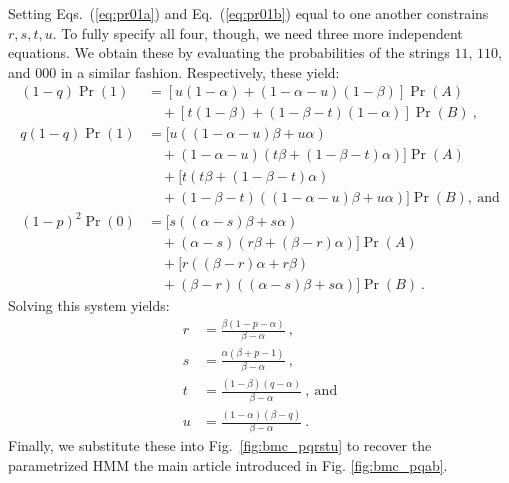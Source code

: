 \documentclass[final,nofootinbib,aps,pre,twocolumn,showpacs,groupaddress,preprintnumbers,floatfix]{revtex4-1}
\begin{document}
Setting Eqs.~(\ref{eq:pr01a}) and Eq.~(\ref{eq:pr01b}) equal to one another
constrains $r,s,t,u$. To fully specify all four, though, we need
three more independent equations. We obtain these by evaluating the
probabilities of the strings $11$, $110$, and $000$ in a similar
fashion. Respectively, these yield:
\begin{align*}
(1-q)\Pr(1) &= [u(1-\alpha)+(1-\alpha-u)(1-\beta)]\Pr(A) \\
            & \quad + [t(1-\beta)+(1-\beta-t)(1-\alpha)]\Pr(B)
  ~, \\
q(1-q)\Pr(1) &= [u((1-\alpha-u)\beta+u\alpha)\nonumber\\
             & \quad +(1-\alpha-u)(t\beta+(1-\beta-t)\alpha)]\Pr(A)\nonumber\\
             & \quad + [t(t\beta+(1-\beta-t)\alpha)\nonumber\\
             & \quad +(1-\beta-t)((1-\alpha-u)\beta+u\alpha)]\Pr(B)
  ,~\text{and} \\
(1-p)^2\Pr(0) &= [s((\alpha-s)\beta+s\alpha)\nonumber\\
              & \quad +(\alpha-s)(r\beta+(\beta-r)\alpha)]\Pr(A)\nonumber\\
              & \quad +[r((\beta-r)\alpha+r\beta)\nonumber\\
              & \quad +(\beta-r)((\alpha-s)\beta+s\alpha)]\Pr(B) ~.
\end{align*}
Solving this system yields:
\begin{align*}
  r & =\frac{\beta(1-p-\alpha)}{\beta-\alpha} ~,\\
  s & =\frac{\alpha(\beta+p-1)}{\beta-\alpha} ~,\\
  t & =\frac{(1-\beta)(q-\alpha)}{\beta-\alpha} ~,~\text{and}\\
  u & =\frac{(1-\alpha)(\beta-q)}{\beta-\alpha}
  ~.
\end{align*}
Finally, we substitute these into Fig.~\ref{fig:bmc_pqrstu} to recover the
parametrized HMM the main article introduced in Fig. \ref{fig:bmc_pqab}.
\end{document}
